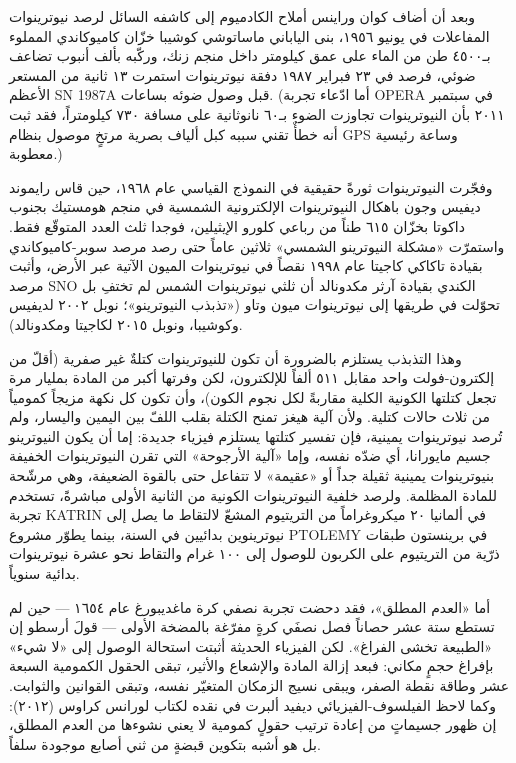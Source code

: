 \documentclass[12pt,a4paper,openany]{book}
\begin{document}
وبعد أن أضاف كوان وراينس أملاح الكادميوم إلى كاشفه السائل لرصد نيوترينوات المفاعلات في يونيو ١٩٥٦، بنى الياباني ماساتوشي كوشيبا خزّان كاميوكاندي المملوء بـ٤٥٠٠ طن من الماء على عمق كيلومتر داخل منجم زنك، وركّبه بألف أنبوب تضاعف ضوئي، فرصد في ٢٣ فبراير ١٩٨٧ دفقة نيوترينوات استمرت ١٣ ثانية من المستعر الأعظم SN 1987A قبل وصول ضوئه بساعات. (أما ادّعاء تجربة OPERA في سبتمبر ٢٠١١ بأن النيوترينوات تجاوزت الضوء بـ٦٠ نانوثانية على مسافة ٧٣٠ كيلومتراً، فقد ثبت أنه خطأٌ تقني سببه كبل ألياف بصرية مرتخٍ موصول بنظام GPS وساعة رئيسية معطوبة.)


وفجّرت النيوترينوات ثورةً حقيقية في النموذج القياسي عام ١٩٦٨، حين قاس رايموند ديفيس وجون باهكال النيوترينوات الإلكترونية الشمسية في منجم هومستيك بجنوب داكوتا بخزّان ٦١٥ طناً من رباعي كلورو الإيثيلين، فوجدا ثلث العدد المتوقّع فقط. واستمرّت «مشكلة النيوترينو الشمسي» ثلاثين عاماً حتى رصد مرصد سوبر-كاميوكاندي بقيادة تاكاكي كاجيتا عام ١٩٩٨ نقصاً في نيوترينوات الميون الآتية عبر الأرض، وأثبت مرصد SNO الكندي بقيادة آرثر مكدونالد أن ثلثي نيوترينوات الشمس لم تختفِ بل تحوّلت في طريقها إلى نيوترينوات ميون وتاو («تذبذب النيوترينو»؛ نوبل ٢٠٠٢ لديفيس وكوشيبا، ونوبل ٢٠١٥ لكاجيتا ومكدونالد).


وهذا التذبذب يستلزم بالضرورة أن تكون للنيوترينوات كتلةٌ غير صفرية (أقلّ من إلكترون-فولت واحد مقابل ٥١١ ألفاً للإلكترون، لكن وفرتها أكبر من المادة بمليار مرة تجعل كتلتها الكونية الكلية مقاربةً لكل نجوم الكون)، وأن تكون كل نكهة مزيجاً كمومياً من ثلاث حالات كتلية. ولأن آلية هيغز تمنح الكتلة بقلب اللفّ بين اليمين واليسار، ولم تُرصد نيوترينوات يمينية، فإن تفسير كتلتها يستلزم فيزياء جديدة: إما أن يكون النيوترينو جسيم مايورانا، أي ضدّه نفسه، وإما «آلية الأرجوحة» التي تقرن النيوترينوات الخفيفة بنيوترينوات يمينية ثقيلة جداً أو «عقيمة» لا تتفاعل حتى بالقوة الضعيفة، وهي مرشّحة للمادة المظلمة. ولرصد خلفية النيوترينوات الكونية من الثانية الأولى مباشرةً، تستخدم تجربة KATRIN في ألمانيا ٢٠ ميكروغراماً من التريتيوم المشعّ لالتقاط ما يصل إلى نيوترينوين بدائيين في السنة، بينما يطوّر مشروع PTOLEMY في برينستون طبقات ذرّية من التريتيوم على الكربون للوصول إلى ١٠٠ غرام والتقاط نحو عشرة نيوترينوات بدائية سنوياً.


أما «العدم المطلق»، فقد دحضت تجربة نصفي كرة ماغديبورغ عام ١٦٥٤ — حين لم تستطع ستة عشر حصاناً فصل نصفَي كرةٍ مفرّغة بالمضخة الأولى — قولَ أرسطو إن «الطبيعة تخشى الفراغ». لكن الفيزياء الحديثة أثبتت استحالة الوصول إلى «لا شيء» بإفراغ حجمٍ مكاني: فبعد إزالة المادة والإشعاع والأثير، تبقى الحقول الكمومية السبعة عشر وطاقة نقطة الصفر، ويبقى نسيج الزمكان المتغيّر نفسه، وتبقى القوانين والثوابت. وكما لاحظ الفيلسوف-الفيزيائي ديفيد ألبرت في نقده لكتاب لورانس كراوس (٢٠١٢): إن ظهور جسيماتٍ من إعادة ترتيب حقولٍ كمومية لا يعني نشوءها من العدم المطلق، بل هو أشبه بتكوين قبضةٍ من ثني أصابع موجودة سلفاً.
\end{document}
